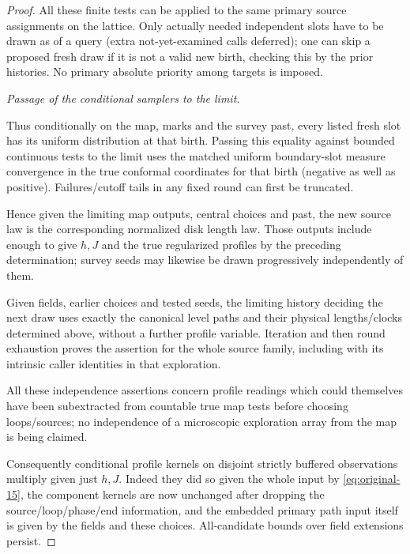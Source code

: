 \begin{proof}
All these finite tests can be applied to the same primary source assignments on the lattice. Only
actually needed independent slots have to be drawn as of a query (extra not-yet-examined calls
deferred); one can skip a proposed fresh draw if it is not a valid new birth, checking this by the
prior histories. No primary absolute priority among targets is imposed.

\smallskip\noindent\emph{Passage of the conditional samplers to the limit.}\par

Thus conditionally on the map, marks and the survey past, every listed fresh slot has its uniform
distribution at that birth. Passing this equality against bounded continuous tests to the limit uses
the matched uniform boundary-slot measure convergence in the true conformal coordinates for that
birth (negative as well as positive). Failures/cutoff tails in any fixed round can first be
truncated.

Hence given the limiting map outputs, central choices and past, the new source law is the
corresponding normalized disk length law. Those outputs include enough to give \(h,J\) and the true
regularized profiles by the preceding determination; survey seeds may likewise be drawn
progressively independently of them.

Given fields, earlier choices and tested seeds, the limiting history deciding the next draw uses
exactly the canonical level paths and their physical lengths/clocks determined above, without a
further profile variable. Iteration and then round exhaustion proves the assertion for the whole
source family, including with its intrinsic caller identities in that exploration.

All these independence assertions concern profile readings which could themselves have been
subextracted from countable true map tests before choosing loops/sources; no independence of a
microscopic exploration array from the map is being claimed.

Consequently conditional profile kernels on disjoint strictly buffered observations multiply given
just \(h,J\). Indeed they did so given the whole input by \eqref{eq:original-15}, the component
kernels are now unchanged after dropping the source/loop/phase/end information, and the embedded
primary path input itself is given by the fields and these choices. All-candidate bounds over field
extensions persist.

\end{proof}

